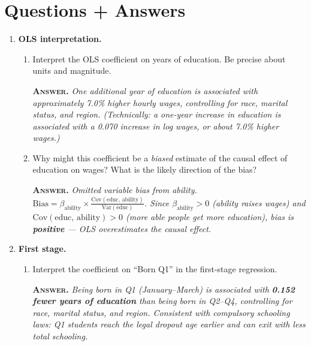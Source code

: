 \documentclass[11pt]{article}
\newcommand{\ans}[1]{%
  \vspace{2pt}%
  {\color{BrickRed}\textsc{\textbf{Answer.}}} \textit{#1}\par\vspace{4pt}%
}
\begin{document}
\section*{Questions + Answers}

\begin{enumerate}
\def\labelenumi{\arabic{enumi}.}

\item \textbf{OLS interpretation.}

\begin{enumerate}
\def\labelenumi{(\alph{enumi})}

\item Interpret the OLS coefficient on years of education. Be precise about units and magnitude.

\ans{One additional year of education is associated with approximately 7.0\% higher hourly wages, controlling for race, marital status, and region. (Technically: a one-year increase in education is associated with a 0.070 increase in log wages, or about 7.0\% higher wages.)}

\item Why might this coefficient be a \textit{biased} estimate of the causal effect of education on wages? What is the likely direction of the bias?

\ans{Omitted variable bias from ability. $\text{Bias} = \beta_{\text{ability}} \times \frac{\text{Cov}(\text{educ},\,\text{ability})}{\text{Var}(\text{educ})}$. Since $\beta_{\text{ability}} > 0$ (ability raises wages) and $\text{Cov}(\text{educ},\,\text{ability}) > 0$ (more able people get more education), bias is \textbf{positive} --- OLS \textit{overestimates} the causal effect.}

\end{enumerate}

\item \textbf{First stage.}

\begin{enumerate}
\def\labelenumi{(\alph{enumi})}

\item Interpret the coefficient on ``Born Q1'' in the first-stage regression.

\ans{Being born in Q1 (January--March) is associated with \textbf{0.152 fewer years of education} than being born in Q2--Q4, controlling for race, marital status, and region. Consistent with compulsory schooling laws: Q1 students reach the legal dropout age earlier and can exit with less total schooling.}


\end{enumerate}
\end{enumerate}
\end{document}
